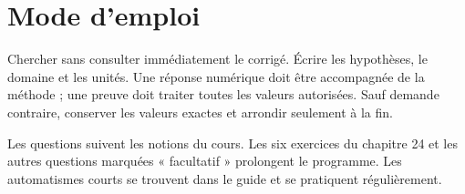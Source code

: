 \documentclass[11pt,a4paper,oneside]{book}
\begin{document}
\frontmatter
\chapter*{Mode d'emploi}
Chercher sans consulter immédiatement le corrigé. Écrire les hypothèses, le domaine et les unités. Une réponse numérique doit être accompagnée de la méthode ; une preuve doit traiter toutes les valeurs autorisées. Sauf demande contraire, conserver les valeurs exactes et arrondir seulement à la fin.

Les questions suivent les notions du cours. Les six exercices du chapitre 24 et les autres questions marquées « facultatif » prolongent le programme. Les automatismes courts se trouvent dans le guide et se pratiquent régulièrement.
\tableofcontents
\mainmatter

























\end{document}
